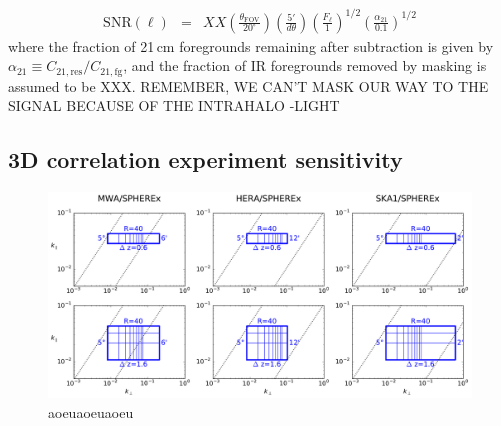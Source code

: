 \documentclass[preprint]{aastex}
\newcommand{\IR}{\text{IR}}
\newcommand{\cosmo}{\text{cosmo}}
\newcommand{\fg}{\text{fg}}
\newcommand{\res}{\text{res}}
\newcommand{\SNR}{\text{SNR}}
\begin{document}

\begin{eqnarray}
	\SNR(\ell)&=&XX \left(\frac{\theta_\text{FOV}}{20^\circ}\right)\left(\frac{5'}{d\theta}\right)\left(\frac{F_\ell}{1}\right)^{1/2}\left(\frac{\alpha_{21}}{0.1}\right)^{1/2}
\end{eqnarray}
where the fraction of 21\,cm foregrounds remaining after subtraction is given by $\alpha_{21}\equiv C_{21,\res}/C_{21,\fg}$, and the fraction of IR foregrounds removed by masking is assumed to be XXX. REMEMBER, WE CAN'T MASK OUR WAY TO THE SIGNAL BECAUSE OF THE INTRAHALO
-LIGHT


\subsection{3D correlation experiment sensitivity}

\begin{figure}[h]
\centering
\includegraphics[width=6.5in]{images/kspace_overlap.pdf}
\caption{aoeuaoeuaoeu}
\label{fig:corgrid}
\end{figure}
\end{document}
